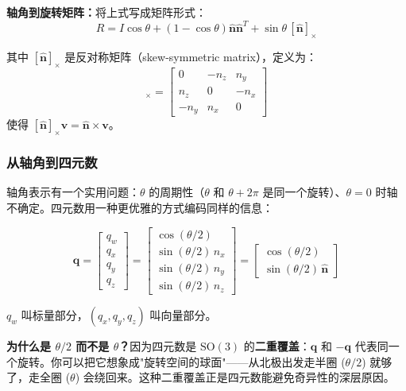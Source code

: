 \textbf{轴角到旋转矩阵：}将上式写成矩阵形式：
\begin{equation}
R = I\cos\theta + (1 - \cos\theta)\hat{\mathbf{n}}\hat{\mathbf{n}}^T + \sin\theta\,[\hat{\mathbf{n}}]_{\times}
\end{equation}

其中 $[\hat{\mathbf{n}}]_{\times}$ 是反对称矩阵（skew-symmetric matrix），定义为：
\begin{equation}
[\hat{\mathbf{n}}]_{\times} = \begin{bmatrix} 0 & -n_z & n_y \\ n_z & 0 & -n_x \\ -n_y & n_x & 0 \end{bmatrix}
\end{equation}
使得 $[\hat{\mathbf{n}}]_{\times}\mathbf{v} = \hat{\mathbf{n}} \times \mathbf{v}$。

\subsubsection{从轴角到四元数}

轴角表示有一个实用问题：$\theta$ 的周期性（$\theta$ 和 $\theta + 2\pi$ 是同一个旋转）、$\theta = 0$ 时轴不确定。四元数用一种更优雅的方式编码同样的信息：

\begin{equation}
\mathbf{q} = \begin{bmatrix} q_w \\ q_x \\ q_y \\ q_z \end{bmatrix} = \begin{bmatrix} \cos(\theta/2) \\ \sin(\theta/2)\,n_x \\ \sin(\theta/2)\,n_y \\ \sin(\theta/2)\,n_z \end{bmatrix} = \begin{bmatrix} \cos(\theta/2) \\ \sin(\theta/2)\,\hat{\mathbf{n}} \end{bmatrix}
\end{equation}

$q_w$ 叫标量部分，$(q_x, q_y, q_z)$ 叫向量部分。

\textbf{为什么是 $\theta/2$ 而不是 $\theta$？}因为四元数是 $\mathrm{SO}(3)$ 的\textbf{二重覆盖}：$\mathbf{q}$ 和 $-\mathbf{q}$ 代表同一个旋转。你可以把它想象成"旋转空间的球面"——从北极出发走半圈 ($\theta/2$) 就够了，走全圈 ($\theta$) 会绕回来。这种二重覆盖正是四元数能避免奇异性的深层原因。

